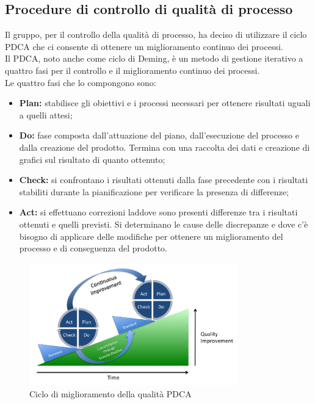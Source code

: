 	\subsection{Procedure di controllo di qualità di processo}
	Il gruppo, per il controllo della qualità di processo, ha deciso di utilizzare il ciclo PDCA che ci consente di ottenere un miglioramento continuo dei processi.\\
	Il PDCA, noto anche come ciclo di Deming, è un metodo di gestione iterativo a quattro fasi per il controllo e il miglioramento continuo dei processi.\\
	Le quattro fasi che lo compongono sono:
		\begin{itemize}
			\item \textbf{Plan:} stabilisce gli obiettivi e i processi necessari per ottenere risultati uguali a quelli attesi;
			\item \textbf{Do:} fase composta dall'attuazione del piano, dall'esecuzione del processo e dalla creazione del prodotto. Termina con una raccolta dei dati e creazione di grafici sul risultato di quanto ottenuto;
			\item \textbf{Check:} si confrontano i risultati ottenuti dalla fase precedente con i risultati stabiliti durante la pianificazione per verificare la presenza di differenze;
			\item \textbf{Act:} si effettuano correzioni laddove sono presenti differenze tra i risultati ottenuti e quelli previsti. Si determinano le cause delle discrepanze e dove c'è bisogno di applicare delle modifiche per ottenere un miglioramento del processo e di conseguenza del prodotto.
		\end{itemize}
		\begin{figure}[h]
			\centering
			\includegraphics[width=90mm]{images/pdca.png}
			\caption{Ciclo di miglioramento della qualità PDCA}
		\end{figure}
	
